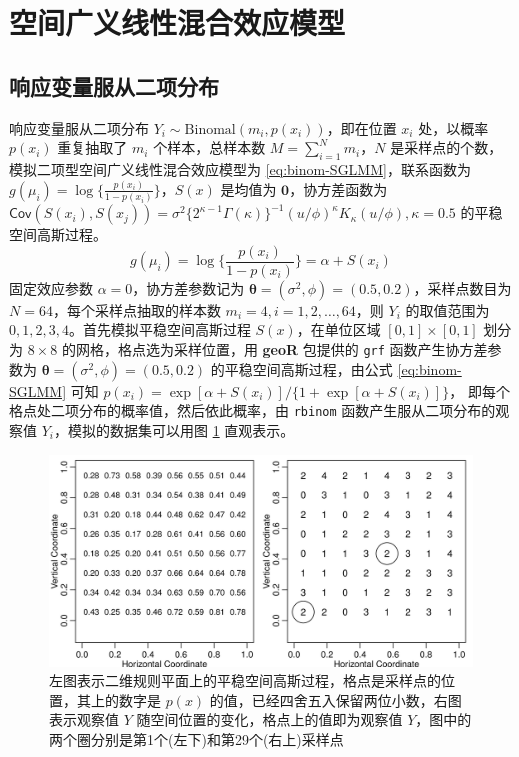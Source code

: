 \documentclass[12pt,a4paper,UTF8,twoside]{book}
\theoremstyle{definition}
\theoremstyle{definition}
\theoremstyle{definition}
\theoremstyle{remark}
\begin{document}
\hypertarget{sim-sglmm}{%
\section{空间广义线性混合效应模型}\label{sim-sglmm}}

\hypertarget{sim-binomal-sglmm}{%
\subsection{响应变量服从二项分布}\label{sim-binomal-sglmm}}

响应变量服从二项分布
\(Y_{i} \sim \mathrm{Binomal}(m_{i},p(x_{i}))\)，即在位置 \(x_i\)
处，以概率 \(p(x_i)\) 重复抽取了 \(m_i\) 个样本，总样本数
\(M=\sum_{i=1}^{N}m_i\)，\(N\)
是采样点的个数，模拟二项型空间广义线性混合效应模型为
\eqref{eq:binom-SGLMM}，联系函数为
\(g(\mu_i) = \log\{\frac{p(x_i)}{1-p(x_i)}\}\)，\(S(x)\) 是均值为
\(\mathbf{0}\)，协方差函数为
\(\mathsf{Cov}(S(x_i),S(x_j)) = \sigma^2 \big\{2^{\kappa-1}\Gamma(\kappa)\big\}^{-1}(u/\phi)^{\kappa}K_{\kappa}(u/\phi), \kappa = 0.5\)
的平稳空间高斯过程。 \begin{equation}
g(\mu_i) = \log\big\{\frac{p(x_i)}{1-p(x_i)}\big\} = \alpha + S(x_i) \label{eq:binom-SGLMM}
\end{equation} 固定效应参数 \(\alpha = 0\)，协方差参数记为
\(\boldsymbol{\theta} = (\sigma^2, \phi) = (0.5, 0.2)\)，采样点数目为
\(N = 64\)，每个采样点抽取的样本数 \(m_i = 4, i = 1, 2, \ldots, 64\)，则
\(Y_i\) 的取值范围为 \(0, 1, 2, 3, 4\)。首先模拟平稳空间高斯过程
\(S(x)\)，在单位区域 \([0,1] \times [0,1]\) 划分为 \(8 \times 8\)
的网格，格点选为采样位置，用 \textbf{geoR} 包提供的 \texttt{grf}
函数产生协方差参数为
\(\boldsymbol{\theta} = (\sigma^2,\phi) = (0.5, 0.2)\)
的平稳空间高斯过程，由公式 \eqref{eq:binom-SGLMM} 可知
\(p(x_i) = \exp[\alpha + S(x_i)]/\{1 + \exp[\alpha + S(x_i)]\}\)，
即每个格点处二项分布的概率值，然后依此概率，由 \texttt{rbinom}
函数产生服从二项分布的观察值 \(Y_i\)，模拟的数据集可以用图
\ref{fig:binom-without-nugget-geoRglm} 直观表示。

\begin{figure}

{\centering \includegraphics[width=0.9\linewidth]{figures/binom-without-nugget-geoRglm} 

}

\caption{左图表示二维规则平面上的平稳空间高斯过程，格点是采样点的位置，其上的数字是 $p(x)$ 的值，已经四舍五入保留两位小数，右图表示观察值 $Y$ 随空间位置的变化，格点上的值即为观察值 $Y$，图中的两个圈分别是第1个(左下)和第29个(右上)采样点}\label{fig:binom-without-nugget-geoRglm}
\end{figure}
\end{document}
